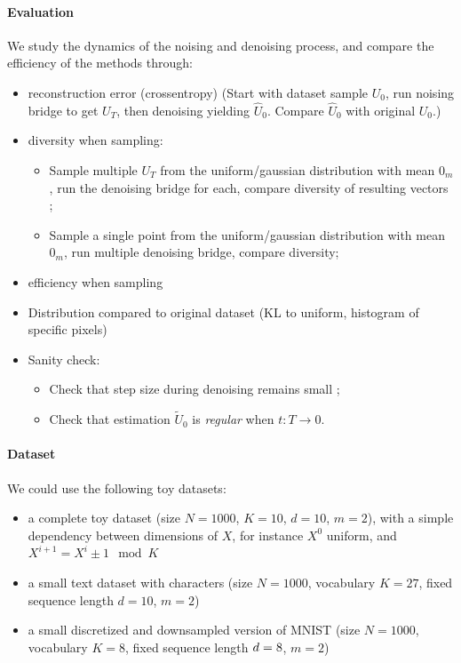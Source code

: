 \documentclass{article}
\begin{document}
\paragraph{Evaluation} We study the dynamics of the noising and denoising process, and compare the efficiency of the methods through:
\begin{itemize}
	\item reconstruction error (crossentropy) (Start with dataset sample $U_0$, run noising bridge to get $U_T$, then denoising yielding $\hat U_0$. Compare $\hat U_0$ with original $U_0$.)
	\item diversity when sampling:
		\begin{itemize}
			\item Sample multiple $U_T$ from the uniform/gaussian distribution with mean $0_m$, run the denoising bridge for each, compare diversity of resulting vectors ;
			\item Sample a single point from the uniform/gaussian distribution with mean $0_m$, run multiple denoising bridge, compare diversity;
		\end{itemize}
	\item efficiency when sampling
	\item Distribution compared to original dataset (KL to uniform, histogram of specific pixels)
	\item Sanity check:
		\begin{itemize}
			\item Check that step size during denoising remains small ;
			\item Check that estimation $\tilde U_0$ is \textit{regular} when $t : T \rightarrow 0$.
		\end{itemize}
\end{itemize}

\paragraph{Dataset} We could use the following toy datasets:

\begin{itemize}
	\item a complete toy dataset (size $N=1000$, $K=10$, $d=10$, $m=2$), with a simple dependency between dimensions of $X$, for instance $X^0$ uniform, and $X^{i+1} = X^i \pm 1 \mod K$
	\item a small text dataset with characters (size $N=1000$, vocabulary $K=27$, fixed sequence length $d=10$, $m=2$)
	\item a small discretized and downsampled version of MNIST (size $N=1000$, vocabulary $K=8$, fixed sequence length $d=8 \time 8$, $m=2$)
\end{itemize}
\end{document}
